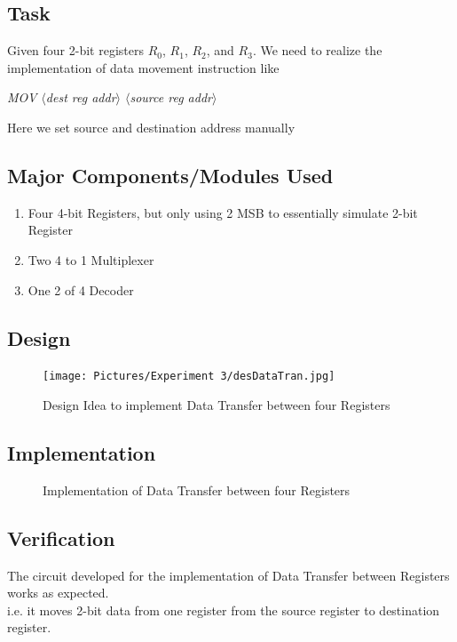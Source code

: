 \documentclass[a4paper]{article}
\begin{document}
\subsection{Task}

Given four 2-bit registers $R_0$, $R_1$, $R_2$, and $R_3$. We need to realize the implementation of data movement instruction like

\emph{MOV $\langle$dest reg addr$\rangle$ $\langle$source reg addr$\rangle$}

\noindent Here we set source and destination address manually

\subsection{Major Components/Modules Used}
\begin{enumerate}
    \item Four 4-bit Registers, but only using 2 MSB to essentially simulate 2-bit Register
    \item Two 4 to 1 Multiplexer
    \item One 2 of 4 Decoder
\end{enumerate}
\pagebreak

\subsection{Design}

\begin{figure}[h!]
    \centering
    \texttt{[image: Pictures/Experiment 3/desDataTran.jpg]}
    \caption{Design Idea to implement Data Transfer between four Registers}
    \label{fig:regDataTran}
\end{figure}

\subsection{Implementation}
\begin{figure}[h!]
    \centering
    \caption{Implementation of Data Transfer between four Registers}
    \label{fig:regDataTran}
\end{figure}

\subsection{Verification}
The circuit developed for the implementation of Data Transfer between Registers works as expected.\\
i.e. it moves 2-bit data from one register from the source register to destination register.
\end{document}
